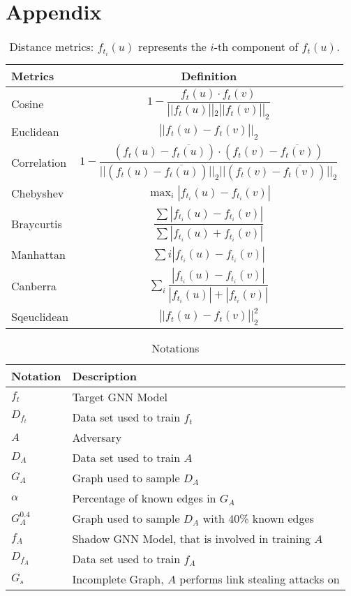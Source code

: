 \chapter*{Appendix}
    \begin{table}[h]
        \centering
        \footnotesize
        \begin{tabular}{l|c}
        \toprule
        Metrics & Definition \\
        \midrule
        Cosine & $1 - \dfrac{f_t(u)\cdot f_t(v)}{\left||f_t(u)\right||_2\left||f_t(v)\right||_2}$ \\
        Euclidean & $\left||f_t(u) - f_t(v)\right||_2$ \\
        Correlation & $1-\dfrac{(f_t(u)-\overline{f_t(u)}) \cdot(f_t(v)-\overline{f_t(v)})}{||(f_t(u)-\overline{f_t(u)})||_{2}||(f_t(v)-\overline{f_t(v)})||_{2}}$ \\
        Chebyshev & $\max _{i}\left|f_{t_i}(u)-f_{t_i}(v)\right|$ \\
        Braycurtis & $\dfrac{\sum\left|f_{t_i}(u)-f_{t_i}(v)\right|} {\sum\left|f_{t_i}(u)+f_{t_i}(v)\right|}$ \\
        Manhattan & $\sum{i}\left|f_{t_i}(u)-f_{t_i}(v)\right|$ \\
        Canberra & $\sum_{i} \dfrac{\left|f_{t_i}(u)-f_{t_i}(v)\right|}{\left|f_{t_i}(u)\right|+\left|f_{t_i}(v)\right|}$ \\
        Sqeuclidean & $\left||f_t(u) - f_t(v)\right||_2^2$ \\
        \bottomrule
        \end{tabular}
        \caption{Distance metrics: $f_{t_i}(u)$ represents the $i$-th component of $f_t(u)$.}
        \label{table:distance}
    \end{table}

    \vspace{1cm}
    \begin{table}[!h]
        \centering
        \footnotesize
        \begin{tabular}{l|l|}
          \toprule
          Notation & Description \\
          \midrule
          $f_t$ & Target GNN Model \\
          $D_{f_t}$ & Data set used to train $f_t$ \\
          $A$ & Adversary \\
          $D_A$ & Data set used to train $A$ \\
          $G_A$ & Graph used to sample $D_A$ \\
          $\alpha$ & Percentage of known edges in $G_A$ \\
          $G_A^{0.4}$ & Graph used to sample $D_A$ with 40\% known edges \\
          $f_A$ & Shadow GNN Model, that is involved in training $A$ \\
          $D_{f_A}$ & Data set used to train $f_A$ \\
          $G_s$ & Incomplete Graph, $A$ performs link stealing attacks on \\
          \bottomrule
        \end{tabular}
        \caption{Notations}
        \label{table:notations}
      \end{table}

